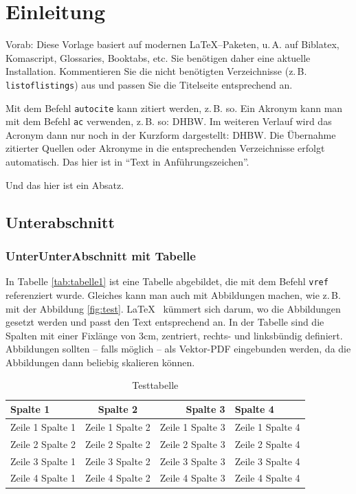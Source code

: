 \chapter{Einleitung}
Vorab: Diese Vorlage basiert auf modernen \LaTeX--Paketen, u.\,A. auf Biblatex, Komascript, Glossaries, Booktabs, etc. 
Sie benötigen daher eine aktuelle Installation. Kommentieren Sie die nicht benötigten Verzeichnisse (z.\,B. \texttt{listoflistings}) aus und passen Sie die Titelseite 
entsprechend an. 

Mit dem Befehl \texttt{autocite} kann zitiert werden, z.\,B. so\autocite[Vgl.][S. 18ff.]{Tanenbaum2012}.
Ein Akronym kann man mit dem Befehl \texttt{ac} verwenden, z.\,B. so: \ac{DHBW}. Im weiteren Verlauf wird das 
Acronym dann nur noch in der Kurzform dargestellt: \ac{DHBW}. Die Übernahme zitierter Quellen oder Akronyme in die 
entsprechenden Verzeichnisse erfolgt automatisch. Das hier ist in \enquote{Text in Anführungszeichen}.

Und das hier ist ein Absatz.



\section{Unterabschnitt}
\lipsum[1]

\subsection{UnterUnterAbschnitt mit Tabelle}
In Tabelle \vref{tab:tabelle1} ist eine Tabelle abgebildet, die mit dem Befehl \texttt{vref} referenziert wurde. Gleiches kann man auch mit Abbildungen 
machen, wie z.\,B. mit der Abbildung \vref{fig:test}. \LaTeX~ kümmert sich darum, wo die Abbildungen gesetzt werden und passt den Text entsprechend an.
In der Tabelle sind die Spalten mit einer Fixlänge von 3cm, zentriert, rechts- und linksbündig definiert. Abbildungen sollten -- falls möglich -- als Vektor-PDF eingebunden 
werden, da die Abbildungen dann beliebig skalieren können.


\lipsum[1-2]
\begin{table}
	\centering
	\begin{tabular}{p{3cm}crl}
		\textbf{Spalte 1} & \textbf{Spalte 2} & \textbf{Spalte 3} & \textbf{Spalte 4}\\\toprule
		Zeile 1 Spalte 1 &  Zeile 1 Spalte 2 & Zeile 1 Spalte 3 & Zeile 1 Spalte 4\\
		Zeile 2 Spalte 2 &  Zeile 2 Spalte 2 & Zeile 2 Spalte 3 & Zeile 2 Spalte 4\\\midrule
		Zeile 3 Spalte 1 &  Zeile 3 Spalte 2 & Zeile 3 Spalte 3 & Zeile 3 Spalte 4\\
		Zeile 4 Spalte 1 &  Zeile 4 Spalte 2 & Zeile 4 Spalte 3 & Zeile 4 Spalte 4\\\bottomrule
	\end{tabular}
	\caption[Testtabelle]{\label{tab:tabelle1}Testtabelle}
\end{table}
\lipsum[1-2]

